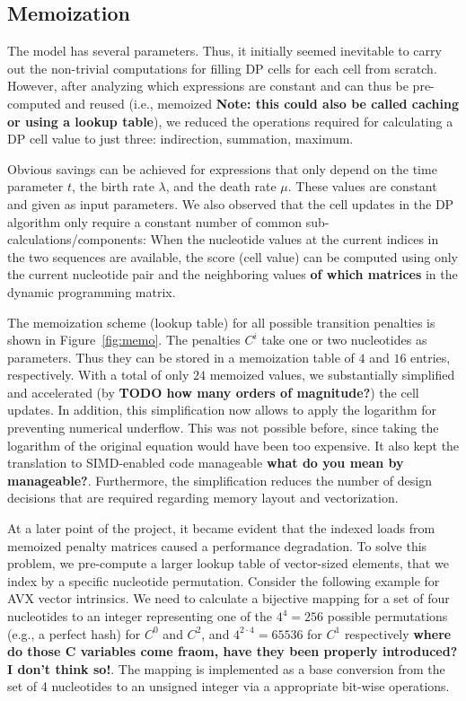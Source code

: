 \documentclass[runningheads,a4paper]{llncs}
\begin{document}
\subsection{Memoization}
\label{ssec:memo}

The \cite{TKF91} model has several parameters. Thus, it initially seemed inevitable to carry out the non-trivial computations for filling DP cells 
for each cell from scratch.
However, after analyzing which expressions are constant and can thus be pre-computed and reused (i.e., memoized {\bf Note: this could also be called caching or using a lookup table}), 
we reduced the operations required for calculating a DP cell value to just three: indirection, summation, maximum.

Obvious savings can be achieved for expressions that only depend on the time parameter $t$, 
the birth rate $\lambda$, and the death rate $\mu$.
These values are constant and given as input parameters. 
We also observed that the cell updates in the DP algorithm only require a constant number of common sub-calculations/components: 
When the nucleotide values at the current indices in the two sequences are available, 
the score (cell value) can be computed using only the current nucleotide pair and the 
neighboring values {\bf of which matrices} in the dynamic programming matrix.

The memoization scheme (lookup table) for all possible transition penalties is shown in Figure~\ref{fig:memo}. 
The penalties $C^i$ take one or two nucleotides as parameters.
Thus they can be stored in a memoization table of $4$ and $16$ entries, respectively. 
With a total of only $24$ memoized values, we substantially simplified and accelerated (by {\bf TODO how many orders of magnitude?}) the cell updates.
In addition, this simplification now allows to apply the logarithm for preventing numerical underflow.
This was not possible before, since taking the logarithm of the original equation would have been too expensive. 
It also kept the translation to SIMD-enabled code manageable {\bf what do you mean by manageable?}.
Furthermore, the simplification reduces the number of design decisions that are required regarding 
memory layout and vectorization.

At a later point of the project, it became evident that the indexed loads from memoized penalty matrices caused a performance degradation. 
To solve this problem, we pre-compute a larger lookup table of vector-sized elements, that we index by a specific nucleotide permutation. 
Consider the following example for AVX vector intrinsics.
We need to calculate a bijective mapping for a set of four nucleotides to an integer representing one of the $4^4 = 256$ possible permutations (e.g., a perfect hash) 
for $C^0$ and $C^2$, and $4^{2 \cdot 4} = 65536$ for $C^1$ respectively {\bf where do those C variables come fraom, have they been properly introduced? I don't think so!}. 
The mapping is implemented as a base conversion from the set of 4 nucleotides to an unsigned integer via a appropriate bit-wise operations.
\end{document}
